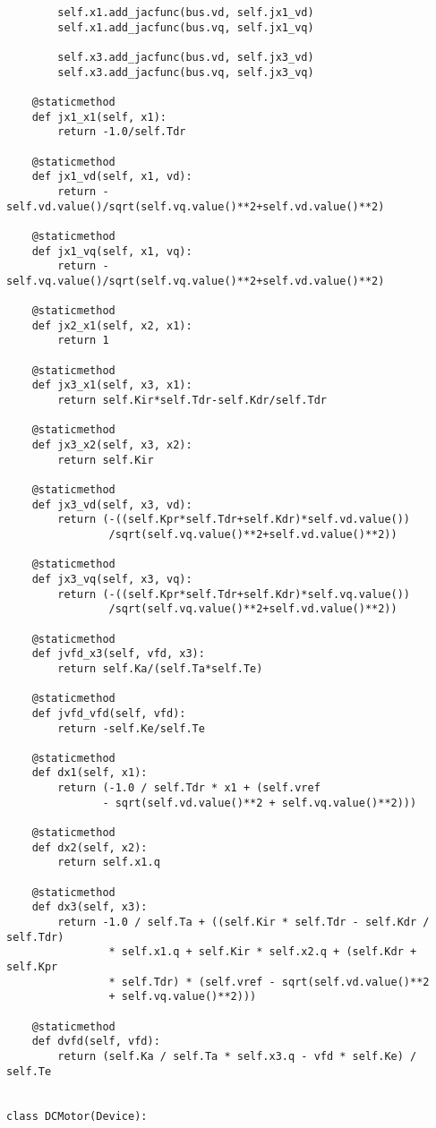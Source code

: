 \begin{lstlisting}
        self.x1.add_jacfunc(bus.vd, self.jx1_vd)
        self.x1.add_jacfunc(bus.vq, self.jx1_vq)

        self.x3.add_jacfunc(bus.vd, self.jx3_vd)
        self.x3.add_jacfunc(bus.vq, self.jx3_vq)

    @staticmethod
    def jx1_x1(self, x1):
        return -1.0/self.Tdr

    @staticmethod
    def jx1_vd(self, x1, vd):
        return -self.vd.value()/sqrt(self.vq.value()**2+self.vd.value()**2)

    @staticmethod
    def jx1_vq(self, x1, vq):
        return -self.vq.value()/sqrt(self.vq.value()**2+self.vd.value()**2)

    @staticmethod
    def jx2_x1(self, x2, x1):
        return 1

    @staticmethod
    def jx3_x1(self, x3, x1):
        return self.Kir*self.Tdr-self.Kdr/self.Tdr

    @staticmethod
    def jx3_x2(self, x3, x2):
        return self.Kir

    @staticmethod
    def jx3_vd(self, x3, vd):
        return (-((self.Kpr*self.Tdr+self.Kdr)*self.vd.value())
                /sqrt(self.vq.value()**2+self.vd.value()**2))

    @staticmethod
    def jx3_vq(self, x3, vq):
        return (-((self.Kpr*self.Tdr+self.Kdr)*self.vq.value())
                /sqrt(self.vq.value()**2+self.vd.value()**2))

    @staticmethod
    def jvfd_x3(self, vfd, x3):
        return self.Ka/(self.Ta*self.Te)

    @staticmethod
    def jvfd_vfd(self, vfd):
        return -self.Ke/self.Te

    @staticmethod
    def dx1(self, x1):
        return (-1.0 / self.Tdr * x1 + (self.vref
               - sqrt(self.vd.value()**2 + self.vq.value()**2)))

    @staticmethod
    def dx2(self, x2):
        return self.x1.q

    @staticmethod
    def dx3(self, x3):
        return -1.0 / self.Ta + ((self.Kir * self.Tdr - self.Kdr / self.Tdr)
                * self.x1.q + self.Kir * self.x2.q + (self.Kdr + self.Kpr
                * self.Tdr) * (self.vref - sqrt(self.vd.value()**2
                + self.vq.value()**2)))

    @staticmethod
    def dvfd(self, vfd):
        return (self.Ka / self.Ta * self.x3.q - vfd * self.Ke) / self.Te


class DCMotor(Device):


\end{lstlisting}
